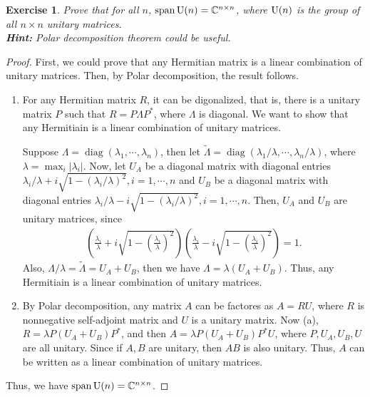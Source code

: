 \documentclass[11pt]{article}
\newtheorem{exercise}{Exercise}[section]
\theoremstyle{definition}
\numberwithin{equation}{subsection}
\begin{document}
\begin{exercise}{\rm *}\label{Aug_2017_6}
Prove that for all $n$, $\operatorname{span} {\rm U}(n) = \mathbb{C}^{n \times n}$, where ${\rm U}(n)$ is the group of all $n \times n$ unitary matrices.\\
{\bf Hint:} Polar decomposition theorem could be useful.
\end{exercise}
\begin{proof}
First, we could prove that any Hermitian matrix is a linear combination of unitary matrices. Then, by Polar decomposition, the result follows\cite{8}.
\begin{enumerate}[label=(\alph*)]
    \item For any Hermitian matrix $R$, it can be digonalized, that is, there is a unitary matrix $P$ such that $R = P \Lambda P^*$, where $\Lambda$ is diagonal. We want to show that any Hermitiain is a linear combination of unitary matrices. 
    
    Suppose $\Lambda = \operatorname{diag}(\lambda_1, \cdots, \lambda_n)$, then let $\widetilde{\Lambda} = \operatorname{diag}(\lambda_1/\lambda, \cdots, \lambda_n/\lambda)$, where $\lambda = \max_{i}|\lambda_i|$. Now, let $U_A$ be a diagonal matrix with diagonal entries $\lambda_i/\lambda + i \sqrt{1 - (\lambda_i/\lambda)^2}, i = 1, \cdots, n$ and $U_B$ be a diagonal matrix with diagonal entries $\lambda_i/\lambda - i \sqrt{1 - (\lambda_i/\lambda)^2}, i = 1, \cdots, n$. Then, $U_A$ and $U_B$ are unitary matrices, since
    \begin{align*}
        \left(\frac{\lambda_i}{\lambda} + i \sqrt{1 - \left(\frac{\lambda_i}{\lambda}\right)^2} \right) \left(\frac{\lambda_i}{\lambda} - i \sqrt{1 - \left(\frac{\lambda_i}{\lambda}\right)^2} \right) = 1.
    \end{align*}
    Also, $\Lambda/\lambda = \widetilde{\Lambda} = U_A + U_B$, then we have $\Lambda = \lambda (U_A + U_B)$. Thus, any Hermitiain is a linear combination of unitary matrices.
    
    \item By Polar decomposition, any matrix $A$ can be factores as $A = RU$, where $R$ is nonnegative self-adjoint matrix and $U$ is a unitary matrix. Now (a), $R = \lambda P (U_A + U_B) P^*$, and then $A = \lambda P (U_A + U_B) P^*U$, where $P, U_A, U_B, U$ are all unitary. Since if $A, B$ are unitary, then $AB$ is also unitary. Thus, $A$ can be written as a linear combination of unitary matrices.
\end{enumerate}
Thus, we have $\operatorname{span} {\rm U}(n) = \mathbb{C}^{n \times n}$.
\end{proof}
\end{document}
